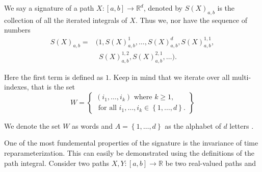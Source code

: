  \begin{definition}[Signature]
     We say a signature of a path $X: \left[ a,b \right] \to  \mathbb{R} ^{d} $, denoted by $S( X) _{a,b}$ is the collection of all the iterated integrals of $X$. Thus we, nor have the sequence of numbers \begin{equation}
     \begin{split}
         S( X) _{a,b}  = & ( 1,  S( X) ^{1}_{a,b}, \ldots, S( X) ^{d}_{a,b}, S( X) ^{1,1}_{a,b}, \\ & \ \  S( X) ^{1,2} _{a,b}, S( X) _{a,b}^{2,1}, \ldots).
     \end{split}
     \end{equation}

     Here the first term is defined as $1$. Keep in mind that we iterate over all multi-indexes, that is the set \begin{equation}
W =\left\{
         \begin{split}
           ( i_{1}, \ldots, i_{k})  \text{ where }  k \ge 1, \\
         \text{ for all } i_{1}, \ldots, i_{k} \in \left\{ 1,\ldots,d \right\} .
         \end{split}
\right\}
     \end{equation}

     We denote the set $W$ as words and $ A = \left\{ 1, \ldots, d \right\} $ as the alphabet of $d $ letters .
 \end{definition}


 One of the most fundemental properties of the signature is the invariance of time reparameterization. This can easily be demonstrated using the definitions of the path integral. Consider two paths $X,Y: \left[ a,b \right]  \to \mathbb{R} $ be two
 real-valued paths and $ $
